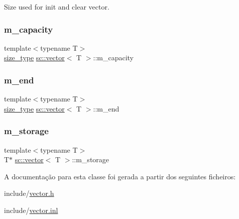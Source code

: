 Size used for init and clear vector. 

\mbox{\label{classsc_1_1vector_a566372683113653e90132001ddec8baa}} 
\subsubsection{\texorpdfstring{m\+\_\+capacity}{m\_capacity}}
{\footnotesize\ttfamily template$<$typename T$>$ \\
\hyperlink{classsc_1_1vector_a48bf37ba1a6d0c13504414d86e27c399}{size\+\_\+type} \hyperlink{classsc_1_1vector}{sc\+::vector}$<$ T $>$\+::m\+\_\+capacity\hspace{0.3cm}{\ttfamily [private]}}

\mbox{\label{classsc_1_1vector_a6975f68db056a83f00912e9f986ca084}} 
\subsubsection{\texorpdfstring{m\+\_\+end}{m\_end}}
{\footnotesize\ttfamily template$<$typename T$>$ \\
\hyperlink{classsc_1_1vector_a48bf37ba1a6d0c13504414d86e27c399}{size\+\_\+type} \hyperlink{classsc_1_1vector}{sc\+::vector}$<$ T $>$\+::m\+\_\+end\hspace{0.3cm}{\ttfamily [private]}}

\mbox{\label{classsc_1_1vector_a1703231d2a20b42fd2814962310baf1d}} 
\subsubsection{\texorpdfstring{m\+\_\+storage}{m\_storage}}
{\footnotesize\ttfamily template$<$typename T$>$ \\
T$\ast$ \hyperlink{classsc_1_1vector}{sc\+::vector}$<$ T $>$\+::m\+\_\+storage\hspace{0.3cm}{\ttfamily [private]}}



A documentação para esta classe foi gerada a partir dos seguintes ficheiros\+:\begin{DoxyCompactItemize}
\item 
include/\hyperlink{vector_8h}{vector.\+h}\item 
include/\hyperlink{vector_8inl}{vector.\+inl}\end{DoxyCompactItemize}
